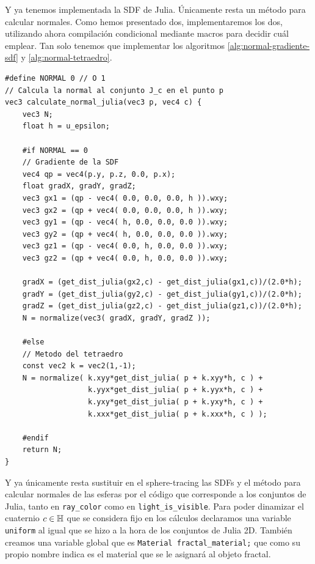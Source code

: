 Y ya tenemos implementada la SDF de Julia. Únicamente resta un método para calcular normales. Como hemos presentado dos, implementaremos los dos, utilizando ahora compilación condicional mediante macros para decidir cuál emplear. Tan solo tenemos que implementar los algoritmos \ref{alg:normal-gradiente-sdf} y \ref{alg:normal-tetraedro}. %

\begin{lstlisting}
#define NORMAL 0 // O 1
// Calcula la normal al conjunto J_c en el punto p
vec3 calculate_normal_julia(vec3 p, vec4 c) {
    vec3 N;
    float h = u_epsilon;

    #if NORMAL == 0
    // Gradiente de la SDF
    vec4 qp = vec4(p.y, p.z, 0.0, p.x);
    float gradX, gradY, gradZ;
    vec3 gx1 = (qp - vec4( 0.0, 0.0, 0.0, h )).wxy;
    vec3 gx2 = (qp + vec4( 0.0, 0.0, 0.0, h )).wxy;
    vec3 gy1 = (qp - vec4( h, 0.0, 0.0, 0.0 )).wxy;
    vec3 gy2 = (qp + vec4( h, 0.0, 0.0, 0.0 )).wxy;
    vec3 gz1 = (qp - vec4( 0.0, h, 0.0, 0.0 )).wxy;
    vec3 gz2 = (qp + vec4( 0.0, h, 0.0, 0.0 )).wxy;
    
    gradX = (get_dist_julia(gx2,c) - get_dist_julia(gx1,c))/(2.0*h);
    gradY = (get_dist_julia(gy2,c) - get_dist_julia(gy1,c))/(2.0*h);
    gradZ = (get_dist_julia(gz2,c) - get_dist_julia(gz1,c))/(2.0*h);
    N = normalize(vec3( gradX, gradY, gradZ ));

    #else
    // Metodo del tetraedro
    const vec2 k = vec2(1,-1);
    N = normalize( k.xyy*get_dist_julia( p + k.xyy*h, c ) + 
                   k.yyx*get_dist_julia( p + k.yyx*h, c ) + 
                   k.yxy*get_dist_julia( p + k.yxy*h, c ) + 
                   k.xxx*get_dist_julia( p + k.xxx*h, c ) );

    #endif
    return N;
}
\end{lstlisting}

Y ya únicamente resta sustituir en el sphere-tracing las SDFs y el método para calcular normales de las esferas por el código que corresponde a los conjuntos de Julia, tanto en \verb|ray_color| como en \verb|light_is_visible|. Para poder dinamizar el cuaternio $c\in\mathbb{H}$ que se considera fijo en los cálculos declaramos una variable \verb|uniform| al igual que se hizo a la hora de los conjuntos de Julia 2D. También creamos una variable global que es \verb|Material fractal_material;| que como su propio nombre indica es el material que se le asignará al objeto fractal.

